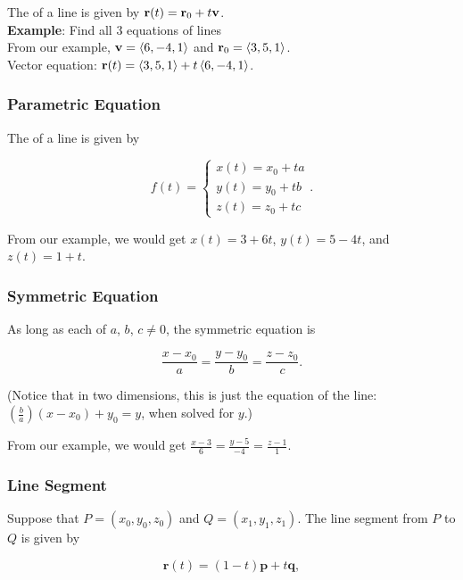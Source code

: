 The  of a line is given by \(\mathbf{r}(t) = \mathbf{r}_{0} + t \mathbf{v}\). \\

\textbf{Example}: Find all 3 equations of lines  \\

From our example, \(\mathbf{v} = \left\langle 6,-4,1 \right\rangle\) and \(\mathbf{r}_{0} = \left\langle 3,5,1 \right\rangle\). \\

Vector equation: \(\mathbf{r}(t) = \left\langle 3,5,1 \right\rangle + t\left\langle 6,-4,1 \right\rangle\).

\subsubsection{Parametric Equation}

The  of a line is given by

\[
    f(t) = \begin{cases}
        x(t) = x_{0} + ta \\
        y(t) = y_{0} + tb \\
        z(t) = z_{0} + tc
    \end{cases}.
\]

From our example, we would get \(x(t) = 3 + 6t\), \(y(t) = 5 - 4t\), and \(z(t) = 1 + t\).

\subsubsection{Symmetric Equation}

As long as each of \(a\), \(b\), \(c \neq 0\), the symmetric equation is

\[
    \frac{x - x_{0}}{a} = \frac{y - y_{0}}{b} = \frac{z - z_{0}}{c}.
\]

(Notice that in two dimensions, this is just the equation of the line: \((\frac{b}{a})(x - x_{0}) + y_{0} = y\), when solved for \(y\).)

From our example, we would get \(\frac{x - 3}{6} = \frac{y - 5}{-4} = \frac{z - 1}{1}\).

\subsubsection{Line Segment}

Suppose that \(P = (x_{0},y_{0},z_{0})\) and \(Q = (x_{1},y_{1},z_{1})\). The line segment from \(P\) to \(Q\) is given by

\[
    \mathbf{r}(t) = (1 - t)\mathbf{p} + t\mathbf{q},
\]

